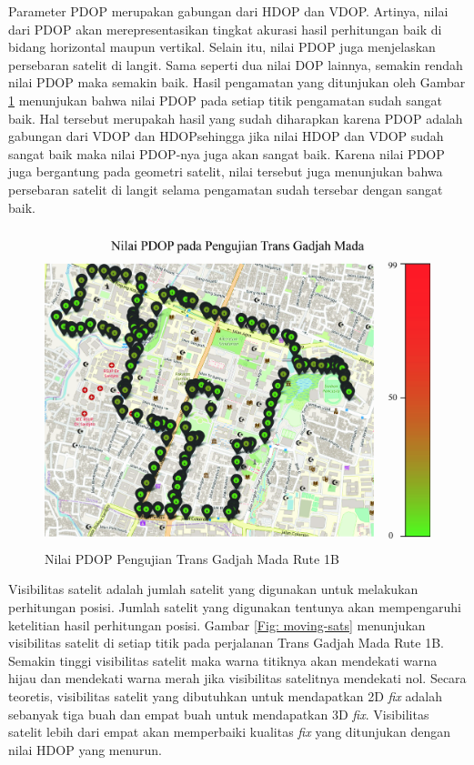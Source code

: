 Parameter PDOP merupakan gabungan dari HDOP dan VDOP. Artinya, nilai dari PDOP akan merepresentasikan tingkat akurasi hasil perhitungan baik di bidang horizontal maupun vertikal. Selain itu, nilai PDOP juga menjelaskan persebaran satelit di langit. Sama seperti dua nilai DOP lainnya, semakin rendah nilai PDOP maka semakin baik. Hasil pengamatan yang ditunjukan oleh Gambar \ref{Fig: moving-pdop} menunjukan bahwa nilai PDOP pada setiap titik pengamatan sudah sangat baik. Hal tersebut merupakah hasil yang sudah diharapkan karena PDOP adalah gabungan dari VDOP dan HDOPsehingga jika nilai HDOP dan VDOP sudah sangat baik maka nilai PDOP-nya juga akan sangat baik. Karena nilai PDOP juga bergantung pada geometri satelit, nilai tersebut juga menunjukan bahwa persebaran satelit di langit selama pengamatan sudah tersebar dengan sangat baik. 

\begin{figure}[H]
	\centering
	\includegraphics[width=12cm]{contents/chapter-4/pengujian-bergerak/moving-PDOP.jpg}
	\caption{Nilai PDOP Pengujian Trans Gadjah Mada Rute 1B}
	\label{Fig: moving-pdop}
\end{figure}

Visibilitas satelit adalah jumlah satelit yang digunakan untuk melakukan perhitungan posisi. Jumlah satelit yang digunakan tentunya akan mempengaruhi ketelitian hasil perhitungan posisi. Gambar \ref{Fig: moving-sats} menunjukan visibilitas satelit di setiap titik pada perjalanan Trans Gadjah Mada Rute 1B. Semakin tinggi visibilitas satelit maka warna titiknya akan mendekati warna hijau dan mendekati warna merah jika visibilitas satelitnya mendekati nol. Secara teoretis, visibilitas satelit yang dibutuhkan untuk mendapatkan 2D \textit{fix} adalah sebanyak tiga buah dan empat buah untuk mendapatkan 3D \textit{fix}. Visibilitas satelit lebih dari empat akan memperbaiki kualitas \textit{fix} yang ditunjukan dengan nilai HDOP yang menurun. 

